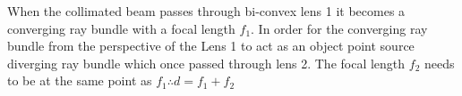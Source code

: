 \documentclass[main.tex]{subfiles}
\begin{document}
When the collimated beam passes through bi-convex lens 1 it becomes a converging ray bundle with a focal length $f_1$. In order for the converging ray bundle from the perspective of the Lens 1 to act as an object point source diverging ray bundle which once passed through lens 2. The focal length $f_2$ needs to be at the same point as $f_1 \therefore d = f_1 + f_2$\\ 





\end{document}
